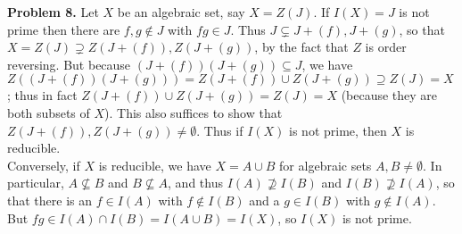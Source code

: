 \documentclass[11pt]{article}
\newcommand{\num}[1]{\noindent \textbf{#1}}
\theoremstyle{definition}
\begin{document}
\num{Problem 8.} Let $X$ be an algebraic set, say $X=Z(J)$. If $I(X)=J$ is
not prime then there are $f,g\notin J$ with $fg\in J$. Thus $J\subsetneq
J+(f), J+(g)$, so that $X=Z(J)\supsetneq Z(J+(f)),Z(J+(g))$, by the fact
that $Z$ is order reversing. But because $(J+(f))(J+(g))\subseteq J$, we
have $Z((J+(f))(J+(g)))=Z(J+(f))\cup Z(J+(g))\supseteq Z(J)=X$; thus in fact
$Z(J+(f))\cup Z(J+(g)) =Z(J)=X$ (because they are both subsets of $X$). This
also suffices to show that $Z(J+(f)),Z(J+(g))\neq\emptyset$. Thus if $I(X)$
is not prime, then $X$ is reducible.\\

Conversely, if $X$ is reducible, we have $X=A\cup B$ for algebraic sets
$A,B\neq\emptyset$. In particular, $A\not\subseteq B$ and $B\not\subseteq
A$, and thus $I(A)\not\supseteq I(B)$ and $I(B)\not\supseteq I(A)$, so that
there is an $f\in I(A)$ with $f\notin I(B)$ and a $g\in I(B)$ with $g\notin
I(A)$. But $fg\in I(A)\cap I(B) = I(A\cup B)=I(X)$, so $I(X)$ is not prime.
\end{document}
